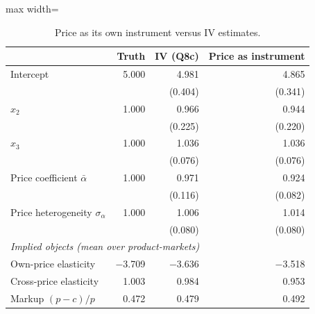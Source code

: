 \begin{table}[H]
\centering\small
\caption{Price as its own instrument versus IV estimates.}\label{tab:q8f_compare}
\begin{adjustbox}{max width=\linewidth}
\begin{tabular}{lrrr}
\toprule
 & Truth & IV (Q8c) & Price as instrument \\
\midrule
Intercept & 5.000 & 4.981 & 4.865 \\
 &  & (0.404) & (0.341) \\
$x_{2}$ & 1.000 & 0.966 & 0.944 \\
 &  & (0.225) & (0.220) \\
$x_{3}$ & 1.000 & 1.036 & 1.036 \\
 &  & (0.076) & (0.076) \\
Price coefficient $\bar\alpha$ & 1.000 & 0.971 & 0.924 \\
 &  & (0.116) & (0.082) \\
Price heterogeneity $\sigma_\alpha$ & 1.000 & 1.006 & 1.014 \\
 &  & (0.080) & (0.080) \\
\midrule
\multicolumn{4}{l}{\emph{Implied objects (mean over product-markets)}} \\
Own-price elasticity & $-$3.709 & $-$3.636 & $-$3.518 \\
Cross-price elasticity & 1.003 & 0.984 & 0.953 \\
Markup $(p-c)/p$ & 0.472 & 0.479 & 0.492 \\
\bottomrule
\end{tabular}
\end{adjustbox}
\par\vspace{3pt}{\footnotesize $T=100$, $J=3$. Standard errors in parentheses. Truth column for implied objects uses the true parameters; markups are model-implied under Bertrand pricing.}
\end{table}

